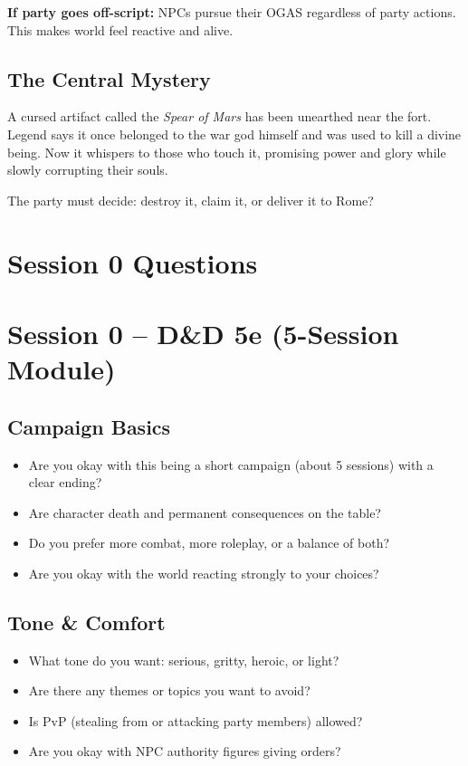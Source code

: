 \documentclass[
]{book}
\providecommand{\tightlist}{%
  \setlength{\itemsep}{0pt}\setlength{\parskip}{0pt}}
\begin{document}
\textbf{If party goes off-script:} NPCs pursue their OGAS regardless of
party actions. This makes world feel reactive and alive.

\section{The Central Mystery}\label{the-central-mystery}

A cursed artifact called the \emph{Spear of Mars} has been unearthed
near the fort. Legend says it once belonged to the war god himself and
was used to kill a divine being. Now it whispers to those who touch it,
promising power and glory while slowly corrupting their souls.

The party must decide: destroy it, claim it, or deliver it to Rome?

\chapter{Session 0 Questions}\label{session-0-questions}

\chapter{Session 0 -- D\&D 5e (5-Session
Module)}\label{session-0-dd-5e-5-session-module}

\section{Campaign Basics}\label{campaign-basics}

\begin{itemize}
\tightlist
\item
  Are you okay with this being a short campaign (about 5 sessions) with
  a clear ending?
\item
  Are character death and permanent consequences on the table?
\item
  Do you prefer more combat, more roleplay, or a balance of both?
\item
  Are you okay with the world reacting strongly to your choices?
\end{itemize}

\section{Tone \& Comfort}\label{tone-comfort}

\begin{itemize}
\tightlist
\item
  What tone do you want: serious, gritty, heroic, or light?
\item
  Are there any themes or topics you want to avoid?
\item
  Is PvP (stealing from or attacking party members) allowed?
\item
  Are you okay with NPC authority figures giving orders?
\end{itemize}
\end{document}
